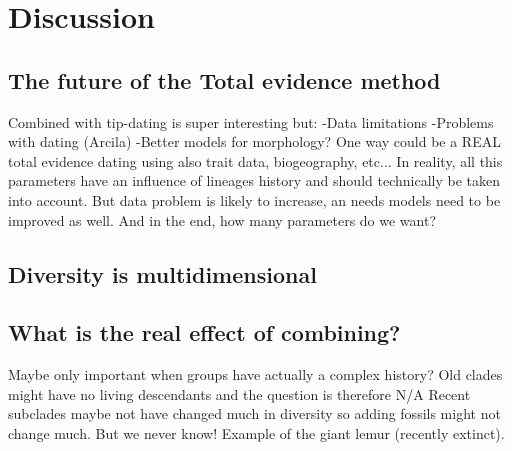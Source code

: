 \chapter{Discussion}
\label{chap:discussion}


\section{The future of the Total evidence method}
Combined with tip-dating is super interesting but:
-Data limitations
-Problems with dating (Arcila)
-Better models for morphology?
One way could be a REAL total evidence dating using also trait data, biogeography, etc...
In reality, all this parameters have an influence of lineages history and should technically be taken into account.
But data problem is likely to increase, an needs models need to be improved as well.
And in the end, how many parameters do we want?

\section{Diversity is multidimensional}


\section{What is the real effect of combining?}
Maybe only important when groups have actually a complex history?
Old clades might have no living descendants and the question is therefore N/A
Recent subclades maybe not have changed much in diversity so adding fossils might not change much.
But we never know! Example of the giant lemur (recently extinct).